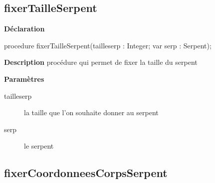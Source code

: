\documentclass{report}
\newif\ifpdf
\begin{document}
\subsection*{fixerTailleSerpent}
\fi
\label{Types-fixerTailleSerpent}
\begin{list}{}{
\setlength{\itemindent}{0cm}
\setlength{\listparindent}{0cm}
\setlength{\leftmargin}{\evensidemargin}
\addtolength{\leftmargin}{\tmplength}
\settowidth{\labelsep}{X}
\addtolength{\leftmargin}{\labelsep}
\setlength{\labelwidth}{\tmplength}
}
\item[\textbf{Déclaration}\hfill]
\ifpdf
\begin{flushleft}
\fi
\begin{ttfamily}
procedure fixerTailleSerpent(tailleserp : Integer; var serp : Serpent);\end{ttfamily}

\ifpdf
\end{flushleft}
\fi

\par
\item[\textbf{Description}]
procédure qui permet de fixer la taille du serpent  \par
\item[\textbf{Paramètres}]
\begin{description}
\item[tailleserp] la taille que l'on souhaite donner au serpent
\item[serp] le serpent
\end{description}


\end{list}
\ifpdf
\subsection*{\large{\textbf{fixerCoordonneesCorpsSerpent}}\normalsize\hspace{1ex}\hrulefill}
\else
\end{document}
